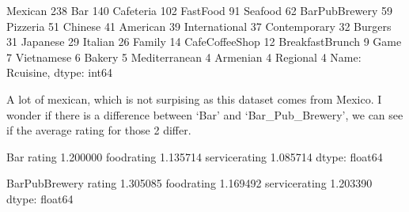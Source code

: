 \documentclass[letterpaper,10pt,english]{jupyterBook}
\begin{document}
\begin{sphinxVerbatim}[commandchars=\\\{\}]
Mexican             238
Bar                 140
Cafeteria           102
Fast\PYGZus{}Food            91
Seafood              62
Bar\PYGZus{}Pub\PYGZus{}Brewery      59
Pizzeria             51
Chinese              41
American             39
International        37
Contemporary         32
Burgers              31
Japanese             29
Italian              26
Family               14
Cafe\PYGZhy{}Coffee\PYGZus{}Shop     12
Breakfast\PYGZhy{}Brunch      9
Game                  7
Vietnamese            6
Bakery                5
Mediterranean         4
Armenian              4
Regional              4
Name: Rcuisine, dtype: int64
\end{sphinxVerbatim}

\sphinxAtStartPar
A lot of mexican, which is not surpising as this dataset comes from Mexico.
I wonder if there is a difference between ‘Bar’ and ‘Bar\_Pub\_Brewery’, we can see if the average rating for those 2 differ.

\begin{sphinxVerbatim}[commandchars=\\\{\}]
   \PYG{p}{[} \PYG{p}{]}
    \PYG{p}{[}\PYG{p}{]}\PYG{p}{[}\PYG{p}{[}  \PYG{p}{]}\PYG{p}{]}
\end{sphinxVerbatim}

\begin{sphinxVerbatim}[commandchars=\\\{\}]
Bar
rating            1.200000
food\PYGZus{}rating       1.135714
service\PYGZus{}rating    1.085714
dtype: float64

Bar\PYGZus{}Pub\PYGZus{}Brewery
rating            1.305085
food\PYGZus{}rating       1.169492
service\PYGZus{}rating    1.203390
dtype: float64
\end{sphinxVerbatim}
\end{document}
